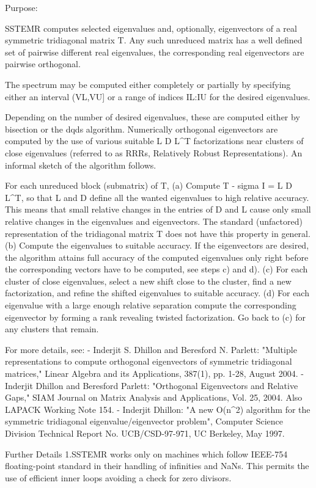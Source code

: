  \begin{DoxyParagraph}{Purpose\+: }
\begin{DoxyVerb} SSTEMR computes selected eigenvalues and, optionally, eigenvectors
 of a real symmetric tridiagonal matrix T. Any such unreduced matrix has
 a well defined set of pairwise different real eigenvalues, the corresponding
 real eigenvectors are pairwise orthogonal.

 The spectrum may be computed either completely or partially by specifying
 either an interval (VL,VU] or a range of indices IL:IU for the desired
 eigenvalues.

 Depending on the number of desired eigenvalues, these are computed either
 by bisection or the dqds algorithm. Numerically orthogonal eigenvectors are
 computed by the use of various suitable L D L^T factorizations near clusters
 of close eigenvalues (referred to as RRRs, Relatively Robust
 Representations). An informal sketch of the algorithm follows.

 For each unreduced block (submatrix) of T,
    (a) Compute T - sigma I  = L D L^T, so that L and D
        define all the wanted eigenvalues to high relative accuracy.
        This means that small relative changes in the entries of D and L
        cause only small relative changes in the eigenvalues and
        eigenvectors. The standard (unfactored) representation of the
        tridiagonal matrix T does not have this property in general.
    (b) Compute the eigenvalues to suitable accuracy.
        If the eigenvectors are desired, the algorithm attains full
        accuracy of the computed eigenvalues only right before
        the corresponding vectors have to be computed, see steps c) and d).
    (c) For each cluster of close eigenvalues, select a new
        shift close to the cluster, find a new factorization, and refine
        the shifted eigenvalues to suitable accuracy.
    (d) For each eigenvalue with a large enough relative separation compute
        the corresponding eigenvector by forming a rank revealing twisted
        factorization. Go back to (c) for any clusters that remain.

 For more details, see:
 - Inderjit S. Dhillon and Beresford N. Parlett: "Multiple representations
   to compute orthogonal eigenvectors of symmetric tridiagonal matrices,"
   Linear Algebra and its Applications, 387(1), pp. 1-28, August 2004.
 - Inderjit Dhillon and Beresford Parlett: "Orthogonal Eigenvectors and
   Relative Gaps," SIAM Journal on Matrix Analysis and Applications, Vol. 25,
   2004.  Also LAPACK Working Note 154.
 - Inderjit Dhillon: "A new O(n^2) algorithm for the symmetric
   tridiagonal eigenvalue/eigenvector problem",
   Computer Science Division Technical Report No. UCB/CSD-97-971,
   UC Berkeley, May 1997.

 Further Details
 1.SSTEMR works only on machines which follow IEEE-754
 floating-point standard in their handling of infinities and NaNs.
 This permits the use of efficient inner loops avoiding a check for
 zero divisors.\end{DoxyVerb}
 
\end{DoxyParagraph}

